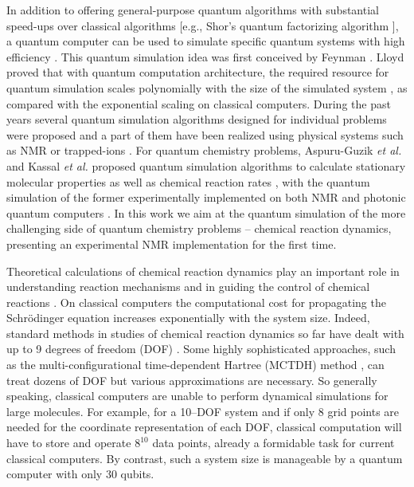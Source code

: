 \documentclass[twocolumn,showpacs,twoside,10pt,prl]{revtex4}
\begin{document}
In addition to offering general-purpose quantum algorithms with substantial speed-ups over classical algorithms \cite{Nielsen}
[e.g., Shor's quantum factorizing algorithm \cite{Shor}], a quantum computer can be used to simulate
specific quantum systems with high efficiency \cite{Buluta}.
This quantum simulation idea was first conceived by Feynman \cite{Feynman}.
Lloyd proved that with quantum computation architecture,
the required resource for quantum simulation scales polynomially
with the size of the simulated system \cite{Lloyd}, as compared with the exponential scaling on  classical computers.
During the past years several quantum simulation algorithms designed for individual problems were
proposed \cite{Zalka,Abrams,Wu,Smirnov,Lidar} and a part of them have been realized
using physical systems such as NMR \cite{Peng,Somaroo,Negrevergne} or trapped-ions \cite{Friedenauer}.
For quantum chemistry problems, Aspuru-Guzik {\it et al.} and Kassal {\it et al.} proposed quantum simulation algorithms
to calculate stationary molecular properties \cite{static} as well as chemical reaction rates \cite{dynamical}, with the quantum simulation
of the former experimentally implemented on both
NMR \cite{static_exp2} and photonic quantum computers \cite{static_exp1}.
In this work we aim at the quantum simulation of the more challenging side of quantum chemistry problems -- chemical reaction dynamics,
presenting an experimental NMR implementation for the first time.

Theoretical calculations of chemical reaction dynamics
play an important role in understanding reaction mechanisms and in guiding
the control of chemical reactions \cite{rabitz,rice-brumer}. On classical computers
the computational cost for propagating the Schr\"{o}dinger equation
increases exponentially with the system size.
Indeed, standard methods in studies of chemical reaction dynamics
so far have dealt with up to 9 degrees of freedom (DOF) \cite{ninedegree}.
Some highly sophisticated approaches,
such as the multi-configurational time-dependent Hartree (MCTDH) method \cite{mctdh},
can treat dozens of DOF but various approximations are necessary.
So generally speaking, classical computers are unable to perform dynamical simulations for large molecules.
For example, for a 10--DOF system
and if only 8 grid points are needed for the coordinate representation of each DOF,
classical computation will have to store and operate $8^{10}$ data points,
already a formidable task for current classical computers.
By contrast, such a system size is manageable by a quantum computer with
only 30 qubits.
\end{document}
